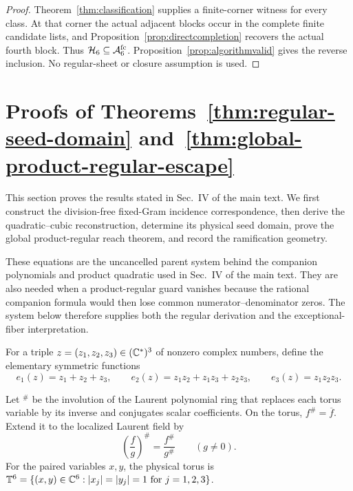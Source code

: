 \begin{proof}
{Theorem~\ref{thm:classification} supplies a finite-corner witness for every class. At that corner the actual adjacent blocks occur in the complete finite candidate lists, and Proposition~\ref{prop:directcompletion} recovers the actual fourth block. Thus $\mathcal H_6\subseteq\mathcal A_6^{\mathrm{fc}}$. Proposition~\ref{prop:algorithmvalid} gives the reverse inclusion. No regular-sheet or closure assumption is used.}
\end{proof}

\section{{Proofs of Theorems~\ref{thm:regular-seed-domain} and~\ref{thm:global-product-regular-escape}}}
\label{sec:supp-reconstruction-geometry}
\label{sec:supp-atlas-proofs}

{This section proves the results stated in Sec.~IV of the main text. We first construct the division-free fixed-Gram incidence correspondence, then derive the quadratic--cubic reconstruction, determine its physical seed domain, prove the global product-regular reach theorem, and record the ramification geometry.}

\def\AtlasEmbedded{1}

\label{sec:supp-global-incidence}

{These equations are the uncancelled parent system behind the companion polynomials and product quadratic used in Sec.~IV of the main text. They are also needed when a product-regular guard vanishes because the rational companion formula would then lose common numerator--denominator zeros. The system below therefore supplies both the regular derivation and the exceptional-fiber interpretation.}

For a triple $z=(z_1,z_2,z_3)\in(\mathbb C^*)^3$ of nonzero complex numbers, define the elementary symmetric functions
\begin{equation}
e_1(z)=z_1+z_2+z_3,\qquad
e_2(z)=z_1z_2+z_1z_3+z_2z_3,\qquad
e_3(z)=z_1z_2z_3.
\label{eq:supp-elementary}
\end{equation}

Let $^{\#}$ be the involution of the Laurent polynomial ring that replaces each torus variable by its inverse and conjugates scalar coefficients.  On the torus, $f^\#=\overline f$. Extend it to the localized Laurent field by
\begin{equation}
\left(\frac fg\right)^\#=\frac{f^\#}{g^\#}
\qquad(g\ne0).
\label{eq:supp-sharp-localization}
\end{equation}
For the paired variables $x,y$, the physical torus is $\mathbb T^6=\{(x,y)\in\mathbb C^6:|x_j|=|y_j|=1\text{ for }j=1,2,3\}$.


